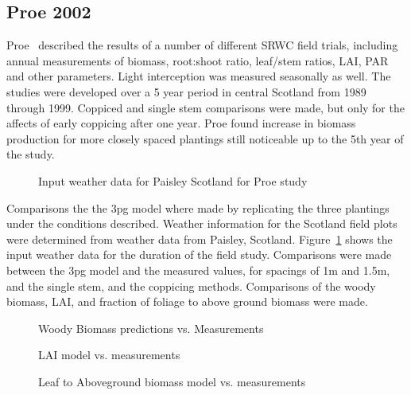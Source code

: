 \documentclass[10pt]{article}
\begin{document}
\subsection*{Proe 2002}

Proe~\cite{Proe2002} described the results of a number of different
\ac{SRWC} field trials, including annual measurements of biomass,
root:shoot ratio, leaf/stem ratios, LAI, PAR and other parameters.
Light interception was measured seasonally as well.  The studies were
developed over a 5 year period in central Scotland from 1989 through
1999. Coppiced and single stem comparisons
were made, but only for the affects of early coppicing after one year.
Proe found increase in biomass production for more closely spaced
plantings still noticeable up to the 5th year of the study.

\begin{figure}
  \centering
  
  \caption{Input weather data for Paisley Scotland for Proe study}
  \label{fig:proe-weather}
\end{figure}

Comparisons the the \ac{3pg} model where made by replicating the three
plantings under the conditions described.  Weather information for the
Scotland field plots were determined from weather data from Paisley,
Scotland.  Figure~\ref{fig:proe-weather} shows the input weather data
for the duration of the field study.  Comparisons were made between
the \ac{3pg} model and the measured values, for spacings of 1m and
1.5m, and the single stem, and the coppicing methods.  Comparisons of
the woody biomass, \ac{LAI}, and fraction of foliage to above ground
biomass were made.

\begin{figure}
  \centering
  
  \caption{Woody Biomass predictions vs. Measurements}
  \label{fig:proe-wood}
\end{figure}

\begin{figure}[!ht]
  \centering
    
  \caption{\ac{LAI} model vs. measurements}
  \label{fig:proe-light}
\end{figure}

\begin{figure}[!ht]
  \centering
    
  \caption{Leaf to Aboveground biomass model vs. measurements}
  \label{fig:proe-leaf}
\end{figure}
\end{document}
